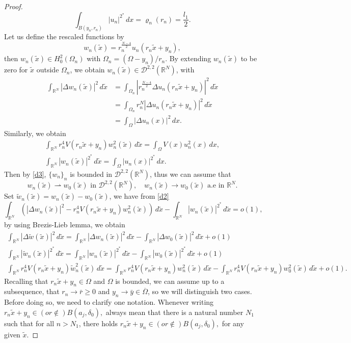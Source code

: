 \documentclass[10pt,a4paper]{amsart}
\numberwithin{equation}{section}
\begin{document}
\begin{proof}
 \[
 \int _{B(y_n, r_n)}|u_n|^{2^*}\,dx=\varrho_n(r_n)=\frac{l_1}{2}.
 \]
 Let us define the rescaled functions by
\[
 w_n(\tilde{x})=r_n^{\frac{N-4}{2}}u_n(r_n\tilde{x}+y_n),
\]
then \(w_n(\tilde{x})\in H^2_0(\Omega_n)\) with \(\Omega_n=(\Omega-y_n)/r_n\). By extending \(w_n(\tilde{x})\) to be zero for \(\tilde{x}\) outside \(\Omega_n\), we obtain \(w_n(\tilde{x})\in \mathcal{D}^{2,2}(\mathbb{R}^N)\), with
\begin{align*}
 \int_{\mathbb{R}^N}|\Delta w_n(\tilde{x})|^2\,d\tilde{x}&=\int_{\Omega_{n}}|r_n^{\frac{N-4}{2}}\Delta u_n(r_n\tilde{x}+y_n)|^2\,d\tilde{x}\\
 &=\int_{\Omega_{n}}r_n^N|\Delta u_n(r_n\tilde{x}+y_n)|^2\,d\tilde{x}\\
 &=\int_{\Omega}|\Delta u_n(x)|^2\,dx.
\end{align*}
Similarly, we obtain
\begin{gather*}
\int_{\mathbb{R}^N}r_n^4V(r_n\tilde{x}+y_n)w_n^2(\tilde{x})\,d\tilde{x}
=\int_{\Omega}V(x)u_n^2(x)\,dx, \\
 \int _{\mathbb{R}^N}|w_n(\tilde{x})|^{2^*}\,d\tilde{x}
 = \int_{\Omega}|u_n(x)|^{2^*}\,dx.
\end{gather*}
Then by \eqref{d3}, \(\{w_n\}_n\) is bounded in \(\mathcal{D}^{2,2}(\mathbb{R}^N)\),
thus we can assume that
 \[
 w_n(\tilde{x})\rightharpoonup w_0(\tilde{x}) \text{ in }
  \mathcal{D}^{2,2}(\mathbb{R}^N), \quad
 w_n(\tilde{x})\to w_0(\tilde{x}) \text{ a.e  in } \mathbb{R}^N.
 \]
Set \(\tilde{w}_n(\tilde{x})= w_n(\tilde{x})-w_0(\tilde{x})\), we have
from \eqref{d2}
\begin{equation}\label{d4}
 \int_{\mathbb{R}^N}\left( |\Delta w_n(\tilde{x})|^2
 -r_n^4 V(r_n\tilde{x}+y_n)w_n^2(\tilde{x})\right)\, d\tilde{x}-\int _{\mathbb{R}^N}|w_n(\tilde{x})|^{2^*}\,d\tilde{x}=o(1),
\end{equation}
by using Brezis-Lieb lemma, we obtain
 \begin{gather*}
 \int_{\mathbb{R}^N}|\Delta \tilde{w}(\tilde{x})|^2\,d\tilde{x}=\int_{\mathbb{R}^N}|\Delta w_n(\tilde{x})|^2\,d\tilde{x}-\int_{\mathbb{R}^N}|\Delta w_0(\tilde{x})|^2\,d\tilde{x}+o(1)\\
 \int _{\mathbb{R}^N}|\tilde{w}_n(\tilde{x})|^{2^*}\,d\tilde{x}=\int _{\mathbb{R}^N}|w_n(\tilde{x})|^{2^*}\,d\tilde{x}-\int _{\mathbb{R}^N}|w_0(\tilde{x})|^{2^*}\,d\tilde{x}+o(1)\\
 \int_{\mathbb{R}^N}r_n^4V(r_n\tilde{x}+y_n)\tilde{w}_n^2(\tilde{x})\,d\tilde{x}
 =\int_{\mathbb{R}^N}r_n^4V(r_n\tilde{x}+y_n)w_n^2(\tilde{x})\,d\tilde{x}
  -\int_{\mathbb{R}^N}r_n^4V(r_n\tilde{x}+y_n)w_0^2(\tilde{x})\,d\tilde{x}+o(1).
 \end{gather*}
Recalling that \(r_n\tilde{x}+y_n\in \Omega\) and \(\Omega\) is bounded, we can assume
up to a subsequence, that \(r_n\to \bar{r}\geq 0\) and
\(y_n \to \bar {y}\in \overline{\Omega}\), so we will distinguish two cases. Before
doing so, we need to clarify one notation.
Whenever writing \( r_n\tilde{x}+y_n \in (or \notin) B(a_j, \delta_0), \) always
mean that there is a natural number \(N_1\) such that for all \(n>N_1\),
there holds \( r_n\tilde{x}+y_n \in (or \notin) B(a_j, \delta_0), \) for any given
\(\tilde{x}\).
\smallskip


\end{proof}
\end{document}
